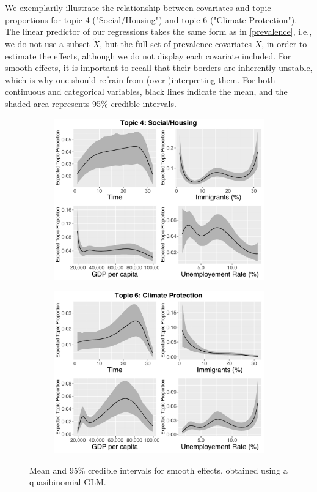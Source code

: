We exemplarily illustrate the relationship between covariates and topic proportions for topic 4 ("Social/Housing") and topic 6 ("Climate Protection"). The linear predictor of our regressions takes the same form as in  \eqref{prevalence}, i.e., we do not use a subset $\tilde{X}$, but the full set of prevalence covariates $X$, in order to estimate the effects, although we do not display each covariate included. For smooth effects, it is important to recall that their borders are inherently unstable, which is why one should refrain from (over-)interpreting them. For both continuous and categorical variables, black lines indicate the mean, and the shaded area represents 95\% credible intervals.

\begin{figure}[h!]
  \centering
  \captionsetup{justification=centering,margin=2cm}
  \begin{subfigure}[b]{0.49\linewidth}
    \includegraphics[width=\linewidth]{../plots/4_4/quasi_t4_cont.pdf}
  \end{subfigure}
  \begin{subfigure}[b]{0.49\linewidth}
    \includegraphics[width=\linewidth]{../plots/4_4/quasi_t6_cont.pdf}
  \end{subfigure}
  \caption{Mean and 95\% credible intervals for smooth effects, obtained using a quasibinomial GLM.}
  \label{fig:coffee}
\end{figure}

